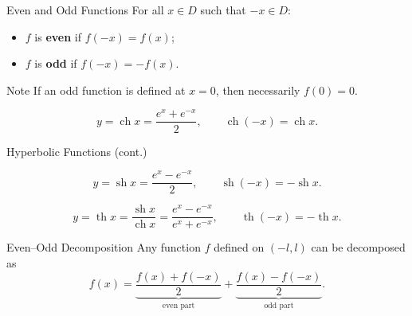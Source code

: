 \documentclass[aspectratio=169,10pt]{beamer}
\begin{document}
\begin{frame}{Even and Odd Functions}
  For all $x\in D$ such that $-x\in D$:
  \pause
  \begin{definition}[Parity]
    \begin{itemize}
      \item $f$ is \textbf{even} if $f(-x)=f(x)$;
      \pause
      \item $f$ is \textbf{odd} if $f(-x)=-f(x)$.
    \end{itemize}
  \end{definition}
  \pause
  \begin{alertblock}{Note}
    If an odd function is defined at $x=0$, then necessarily $f(0)=0$.
  \end{alertblock}
  \pause
  \begin{example}
    \[
      y = \operatorname{ch}x = \frac{e^{x}+e^{-x}}{2},\qquad
      \operatorname{ch}(-x)=\operatorname{ch}x.
    \]
  \end{example}
\end{frame}

\begin{frame}{Hyperbolic Functions (cont.)}
  \begin{example}
    \[
      y = \operatorname{sh}x = \frac{e^{x}-e^{-x}}{2},\qquad
      \operatorname{sh}(-x)=-\operatorname{sh}x.
    \]
  \end{example}
  \pause
  \begin{example}
    \[
      y = \operatorname{th}x = \frac{\operatorname{sh}x}{\operatorname{ch}x}
        = \frac{e^{x}-e^{-x}}{e^{x}+e^{-x}},\qquad
      \operatorname{th}(-x)=-\operatorname{th}x.
    \]
  \end{example}
  \pause
  \begin{block}{Even--Odd Decomposition}
    Any function $f$ defined on $(-l,l)$ can be decomposed as
    \[
      f(x) = \underbrace{\frac{f(x)+f(-x)}{2}}_{\text{even part}}
           + \underbrace{\frac{f(x)-f(-x)}{2}}_{\text{odd part}}.
    \]
  \end{block}
\end{frame}
\end{document}
